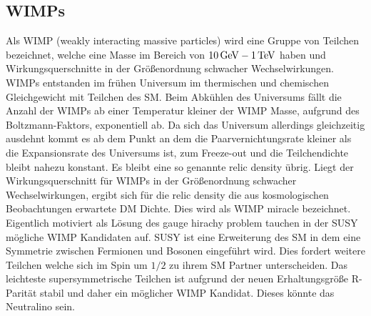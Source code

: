 \subsection*{WIMPs}
Als WIMP (weakly interacting massive particles) wird eine Gruppe von Teilchen bezeichnet, welche eine Masse im Bereich von $\SI{10}{\giga\electronvolt}\--\SI{1}{\tera\electronvolt}$ haben und Wirkungsquerschnitte in der Größenordnung schwacher Wechselwirkungen\cite{Drees2012}.
WIMPs entstanden im frühen Universum im thermischen und chemischen Gleichgewicht mit Teilchen des \ac{SM}. 
Beim Abkühlen des Universums fällt die Anzahl der WIMPs ab einer Temperatur kleiner der WIMP Masse, aufgrund des Boltzmann-Faktors, exponentiell ab.
Da sich das Universum allerdings gleichzeitig ausdehnt kommt es ab dem Punkt an dem die Paarvernichtungsrate kleiner als die Expansionsrate des Universums ist, zum Freeze-out und die Teilchendichte bleibt nahezu konstant.
Es bleibt eine so genannte relic density übrig.
Liegt der Wirkungsquerschnitt für WIMPs in der Größenordnung schwacher Wechselwirkungen, ergibt sich für die relic density die aus kosmologischen Beobachtungen erwartete DM Dichte.
Dies wird als WIMP miracle bezeichnet.
Eigentlich motiviert als Lösung des gauge hirachy problem tauchen in der \ac{SUSY} mögliche WIMP Kandidaten auf.
SUSY ist eine Erweiterung des SM in dem eine Symmetrie zwischen Fermionen und Bosonen eingeführt wird.
Dies fordert weitere Teilchen welche sich im Spin um $1/2$ zu ihrem SM Partner unterscheiden.
Das leichteste supersymmetrische Teilchen ist aufgrund der neuen Erhaltungsgröße R-Parität stabil und daher ein möglicher WIMP Kandidat.
Dieses könnte das Neutralino sein.\cite{Feng2010}



